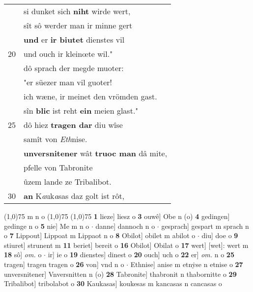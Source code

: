 \documentclass[8pt,a4paper,notitlepage]{article}
\begin{document}
\begin{table}[ht]
\begin{minipage}[t]{0.5\linewidth}
\begin{tabular}{rl}
 & si dunket sich \textbf{niht} wirde wert,\\ 
 & sît sô werder man ir minne gert\\ 
 & \textbf{und} er \textbf{ir biutet} dienstes vil\\ 
20 & und ouch ir kleinœte wil."\\ 
 & dô sprach der megde muoter:\\ 
 & "er süezer man vil guoter!\\ 
 & ich wæne, ir meinet den vrömden gast.\\ 
 & sîn \textbf{blic} ist reht \textbf{ein} meien glast."\\ 
25 & dô hiez \textbf{tragen dar} diu wîse\\ 
 & samît von \textit{Eth}nise.\\ 
 & \textbf{unversnitener} wât \textbf{truoc man} dâ mite,\\ 
 & pfelle von Tabronite\\ 
 & ûzem lande ze Tribalibot.\\ 
30 & \textbf{an} K\textit{a}uk\textit{a}sas daz golt ist rôt,\\ 
\end{tabular}
\scriptsize
\line(1,0){75} \newline
m n o \newline
\line(1,0){75} \newline
\newline
\line(1,0){75} \newline
\textbf{1} lieze] liesz o \textbf{3} ouwê] Obe n (o) \textbf{4} gedingen] gedinge n o \textbf{5} nie] Me m n o  $\cdot$ danne] dannoch n o  $\cdot$ gesprach] gespart m sprach n o \textbf{7} Lippout] Lippoat m Lippaot n o \textbf{8} Obilot] obilet m abilot o  $\cdot$ diu] doe o \textbf{9} stiuret] strunent m \textbf{11} beriet] bereit o \textbf{16} Obilot] Obilat o \textbf{17} wert] [wet]: wert m \textbf{18} sô] \textit{om.} o  $\cdot$ ir] ie o \textbf{19} dienstes] dinest o \textbf{20} ouch] uch o \textbf{22} er] \textit{om.} n o \textbf{25} tragen] tragen tragen o \textbf{26} von] vnd n o  $\cdot$ Ethnise] anise m etnẏse n etnise o \textbf{27} unversnitener] Vnversnitten n (o) \textbf{28} Tabronite] thabronit n thabornitte o \textbf{29} Tribalibot] tribolabot o \textbf{30} Kaukasas] koukesas m kancasas n cancasas o \newline
\end{minipage}
\end{table}
\newpage
\end{document}
